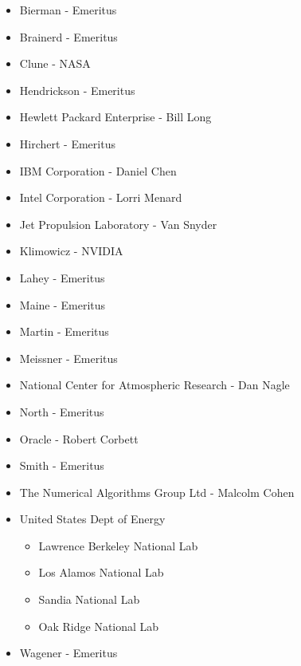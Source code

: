 \documentclass[10pt,letterpaper,twoside]{article}
\begin{document}
\begin{itemize}

\item{Bierman - Emeritus}

\item{Brainerd - Emeritus} 

\item{Clune - NASA}

\item{Hendrickson - Emeritus} 

\item{Hewlett Packard Enterprise - Bill Long}

\item{Hirchert - Emeritus} 

\item{IBM Corporation - Daniel Chen}

\item{Intel Corporation - Lorri Menard}

\item{Jet Propulsion Laboratory - Van Snyder}

\item{Klimowicz - NVIDIA}

\item{Lahey - Emeritus} 

\item{Maine - Emeritus} 

\item{Martin - Emeritus} 

\item{Meissner - Emeritus} 

\item{National Center for Atmospheric Research - Dan Nagle}

\item{North - Emeritus} 

\item{Oracle - Robert Corbett}

\item{Smith - Emeritus}

\item{The Numerical Algorithms Group Ltd - Malcolm Cohen}

\item{United States Dept of Energy}

\begin{itemize}

\item{Lawrence Berkeley National Lab}

\item{Los Alamos National Lab}

\item{Sandia National Lab}

\item{Oak Ridge National Lab}

\end{itemize}

\item{Wagener - Emeritus}

\end{itemize}
\end{document}
